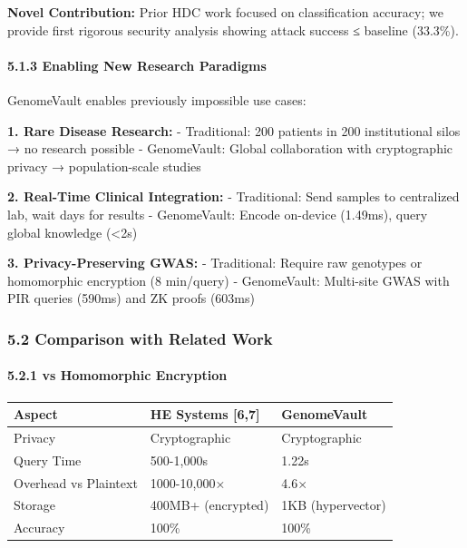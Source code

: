 \documentclass[
  11pt,
]{article}
\begin{document}
\textbf{Novel Contribution:} Prior HDC work focused on classification
accuracy; we provide first rigorous security analysis showing attack
success ≤ baseline (33.3\%).

\paragraph{5.1.3 Enabling New Research
Paradigms}\label{enabling-new-research-paradigms}

GenomeVault enables previously impossible use cases:

\textbf{1. Rare Disease Research:} - Traditional: 200 patients in 200
institutional silos → no research possible - GenomeVault: Global
collaboration with cryptographic privacy → population-scale studies

\textbf{2. Real-Time Clinical Integration:} - Traditional: Send samples
to centralized lab, wait days for results - GenomeVault: Encode
on-device (1.49ms), query global knowledge (\textless2s)

\textbf{3. Privacy-Preserving GWAS:} - Traditional: Require raw
genotypes or homomorphic encryption (8 min/query) - GenomeVault:
Multi-site GWAS with PIR queries (590ms) and ZK proofs (603ms)

\subsubsection{5.2 Comparison with Related
Work}\label{comparison-with-related-work}

\paragraph{5.2.1 vs Homomorphic
Encryption}\label{vs-homomorphic-encryption}

\begin{longtable}[]{@{}lll@{}}
\toprule\noalign{}
Aspect & HE Systems {[}6,7{]} & GenomeVault \\
\midrule\noalign{}
\endhead
\bottomrule\noalign{}
\endlastfoot
Privacy & Cryptographic & Cryptographic \\
Query Time & 500-1,000s & 1.22s \\
Overhead vs Plaintext & 1000-10,000× & 4.6× \\
Storage & 400MB+ (encrypted) & 1KB (hypervector) \\
Accuracy & 100\% & 100\% \\
\end{longtable}
\end{document}
